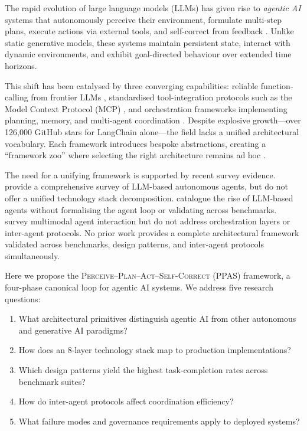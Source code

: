 \documentclass[review]{elsarticle}
\theoremstyle{definition}
\begin{document}
The rapid evolution of large language models (LLMs) has given rise to \emph{agentic AI} systems that autonomously perceive their environment, formulate multi-step plans, execute actions via external tools, and self-correct from feedback \citep{yao2023react,shinn2023reflexion,wang2024survey}. Unlike static generative models, these systems maintain persistent state, interact with dynamic environments, and exhibit goal-directed behaviour over extended time horizons.

This shift has been catalysed by three converging capabilities: reliable function-calling from frontier LLMs \citep{openai2024gpt4o,anthropic2024claude}, standardised tool-integration protocols such as the Model Context Protocol (MCP) \citep{anthropic2024mcp}, and orchestration frameworks implementing planning, memory, and multi-agent coordination \citep{langchain2024langgraph,wu2023autogen}. Despite explosive growth---over 126,000 GitHub stars for LangChain alone---the field lacks a unified architectural vocabulary. Each framework introduces bespoke abstractions, creating a ``framework zoo'' where selecting the right architecture remains ad hoc \citep{masterman2024landscape}.

The need for a unifying framework is supported by recent survey evidence. \citet{wang2024survey} provide a comprehensive survey of LLM-based autonomous agents, but do not offer a unified technology stack decomposition. \citet{xi2023rise} catalogue the rise of LLM-based agents without formalising the agent loop or validating across benchmarks. \citet{durante2024agent} survey multimodal agent interaction but do not address orchestration layers or inter-agent protocols. No prior work provides a complete architectural framework validated across benchmarks, design patterns, and inter-agent protocols simultaneously.

Here we propose the \textsc{Perceive--Plan--Act--Self-Correct} (PPAS) framework, a four-phase canonical loop for agentic AI systems. We address five research questions:

\begin{enumerate}
    \item[\textbf{RQ1.}] What architectural primitives distinguish agentic AI from other autonomous and generative AI paradigms?
    \item[\textbf{RQ2.}] How does an 8-layer technology stack map to production implementations?
    \item[\textbf{RQ3.}] Which design patterns yield the highest task-completion rates across benchmark suites?
    \item[\textbf{RQ4.}] How do inter-agent protocols affect coordination efficiency?
    \item[\textbf{RQ5.}] What failure modes and governance requirements apply to deployed systems?
\end{enumerate}
\end{document}
